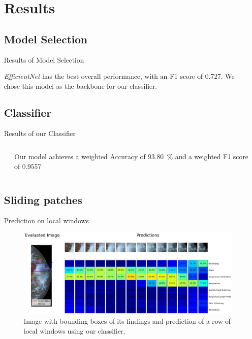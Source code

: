 \section{Results}
\subsection{Model Selection}

\begin{frame}{Results of Model Selection}
    

    \emph{EfficientNet} has the best overall performance, with an F1 score of \num{0.727}. We chose this model as the backbone for our classifier.
\end{frame}

\subsection{Classifier}
\begin{frame}{Results of our Classifier}
    \begin{columns}
        \begin{column}{0.65\textwidth}
            
        \end{column}
        \begin{column}{0.35\textwidth}
            Our model achieves a weighted Accuracy of \SI{93.80}{\percent} and a weighted F1 score of \num{0.9557}
        \end{column}
    \end{columns}
    
\end{frame}

\subsection{Sliding patches}
\begin{frame}{Prediction on local windows}
    \begin{figure}
        \centering
        \includegraphics[width=\textwidth]{imagenes/pred_ventanas.png}
        \caption{Image with bounding boxes of its findings and prediction of a row of local windows using our classifier.}
    \end{figure}
\end{frame}

